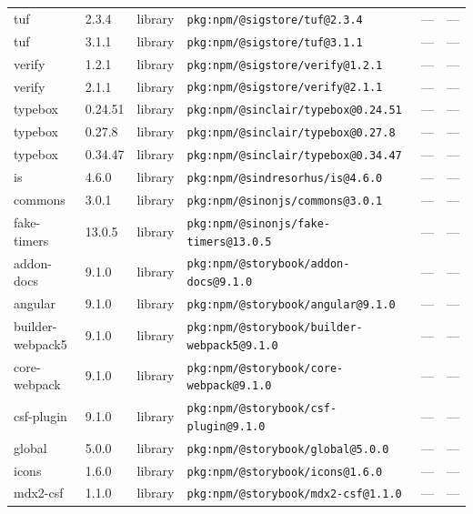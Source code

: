 \documentclass[11pt,a4paper]{article}
\begin{document}
\begin{longtable}{|p{4cm}|p{2cm}|p{1.6cm}|p{5cm}|p{1.5cm}|p{3.5cm}|}
\raggedright tuf & 2.3.4 & library & \small\texttt{pkg:npm/@sigstore/tuf@2.3.4} & — & \small — \\
\raggedright tuf & 3.1.1 & library & \small\texttt{pkg:npm/@sigstore/tuf@3.1.1} & — & \small — \\
\raggedright verify & 1.2.1 & library & \small\texttt{pkg:npm/@sigstore/verify@1.2.1} & — & \small — \\
\raggedright verify & 2.1.1 & library & \small\texttt{pkg:npm/@sigstore/verify@2.1.1} & — & \small — \\
\raggedright typebox & 0.24.51 & library & \small\texttt{pkg:npm/@sinclair/typebox@0.24.51} & — & \small — \\
\raggedright typebox & 0.27.8 & library & \small\texttt{pkg:npm/@sinclair/typebox@0.27.8} & — & \small — \\
\raggedright typebox & 0.34.47 & library & \small\texttt{pkg:npm/@sinclair/typebox@0.34.47} & — & \small — \\
\raggedright is & 4.6.0 & library & \small\texttt{pkg:npm/@sindresorhus/is@4.6.0} & — & \small — \\
\raggedright commons & 3.0.1 & library & \small\texttt{pkg:npm/@sinonjs/commons@3.0.1} & — & \small — \\
\raggedright fake-timers & 13.0.5 & library & \small\texttt{pkg:npm/@sinonjs/fake-timers@13.0.5} & — & \small — \\
\raggedright addon-docs & 9.1.0 & library & \small\texttt{pkg:npm/@storybook/addon-docs@9.1.0} & — & \small — \\
\raggedright angular & 9.1.0 & library & \small\texttt{pkg:npm/@storybook/angular@9.1.0} & — & \small — \\
\raggedright builder-webpack5 & 9.1.0 & library & \small\texttt{pkg:npm/@storybook/builder-webpack5@9.1.0} & — & \small — \\
\raggedright core-webpack & 9.1.0 & library & \small\texttt{pkg:npm/@storybook/core-webpack@9.1.0} & — & \small — \\
\raggedright csf-plugin & 9.1.0 & library & \small\texttt{pkg:npm/@storybook/csf-plugin@9.1.0} & — & \small — \\
\raggedright global & 5.0.0 & library & \small\texttt{pkg:npm/@storybook/global@5.0.0} & — & \small — \\
\raggedright icons & 1.6.0 & library & \small\texttt{pkg:npm/@storybook/icons@1.6.0} & — & \small — \\
\raggedright mdx2-csf & 1.1.0 & library & \small\texttt{pkg:npm/@storybook/mdx2-csf@1.1.0} & — & \small — \\

\end{longtable}
\end{document}

